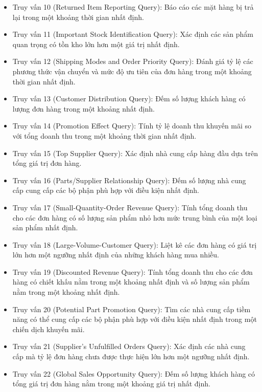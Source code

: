 \documentclass{article}[14pt]
\begin{document}
{\begin{itemize}
Truy vấn 9 (Product Type Profit Measure Query): Tính lợi nhuận của một loại sản phẩm nhất định trong một khoảng thời gian nhất định.
\item Truy vấn 10 (Returned Item Reporting Query): Báo cáo các mặt hàng bị trả lại trong một khoảng thời gian nhất định.
\item Truy vấn 11 (Important Stock Identification Query): Xác định các sản phẩm quan trọng có tồn kho lớn hơn một giá trị nhất định.
\item Truy vấn 12 (Shipping Modes and Order Priority Query): Đánh giá tỷ lệ các phương thức vận chuyển và mức độ ưu tiên của đơn hàng trong một khoảng thời gian nhất định.
\item Truy vấn 13 (Customer Distribution Query): Đếm số lượng khách hàng có lượng đơn hàng trong một khoảng nhất định.
\item Truy vấn 14 (Promotion Effect Query): Tính tỷ lệ doanh thu khuyến mãi so với tổng doanh thu trong một khoảng thời gian nhất định.
\item Truy vấn 15 (Top Supplier Query): Xác định nhà cung cấp hàng đầu dựa trên tổng giá trị đơn hàng.

\item Truy vấn 16 (Parts/Supplier Relationship Query): Đếm số lượng nhà cung cấp cung cấp các bộ phận phù hợp với điều kiện nhất định.
\item Truy vấn 17 (Small-Quantity-Order Revenue Query): Tính tổng doanh thu cho các đơn hàng có số lượng sản phẩm nhỏ hơn mức trung bình của một loại sản phẩm nhất định.
\item Truy vấn 18 (Large-Volume-Customer Query): Liệt kê các đơn hàng có giá trị lớn hơn một ngưỡng nhất định của những khách hàng mua nhiều.
\item Truy vấn 19 (Discounted Revenue Query): Tính tổng doanh thu cho các đơn hàng có chiết khấu nằm trong một khoảng nhất định và số lượng sản phẩm nằm trong một khoảng nhất định.
\item Truy vấn 20 (Potential Part Promotion Query): Tìm các nhà cung cấp tiềm năng có thể cung cấp các bộ phận phù hợp với điều kiện nhất định trong một chiến dịch khuyến mãi.
\item Truy vấn 21 (Supplier's Unfulfilled Orders Query): Xác định các nhà cung cấp mà tỷ lệ đơn hàng chưa được thực hiện lớn hơn một ngưỡng nhất định.
\item Truy vấn 22 (Global Sales Opportunity Query): Đếm số lượng khách hàng có tổng giá trị đơn hàng nằm trong một khoảng giá trị nhất định.
    

\end{itemize}}
\end{document}
